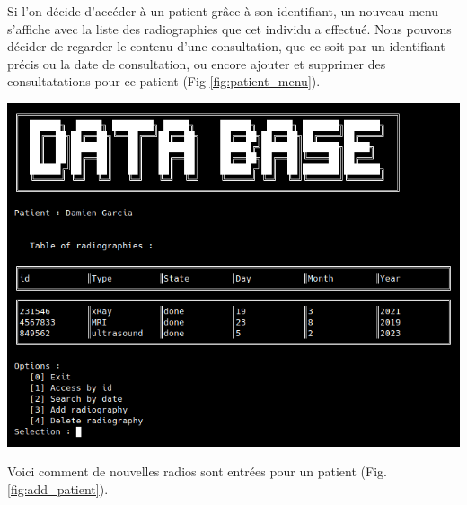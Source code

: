 \documentclass[12pt,a4paper]{article}
\newenvironment{Figure}
{\par\medskip\noindent\minipage{\linewidth}}
{\endminipage\par\medskip}
\begin{document}
\begin{multicols}{2}
		Si l'on décide d'accéder à un patient grâce à son identifiant, un nouveau menu s'affiche avec la liste des radiographies que cet individu a effectué. Nous pouvons décider de regarder le contenu d'une consultation, que ce soit par un identifiant précis ou la date de consultation, ou encore ajouter et supprimer des consultatations pour ce patient (Fig \ref{fig:patient_menu}). \\
		
		\begin{Figure}
			\centering
			\includegraphics[width=\linewidth]{images/walkthrough/doctor_patient_main.png}
			\label{fig:patient_menu}
		\end{Figure}
		
		Voici comment de nouvelles radios sont entrées pour un patient (Fig. \ref{fig:add_patient}). \\
		

\end{multicols}
\end{document}
